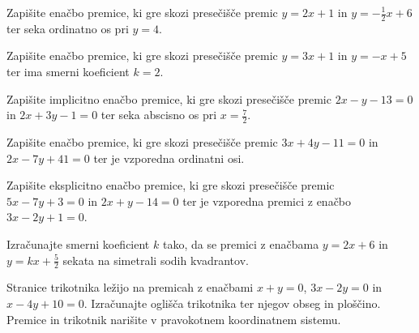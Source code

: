        
            
            \begin{naloga}
                Zapišite enačbo premice, ki gre skozi presečišče premic $y=2x+1$ in $y=-\frac{1}{2}x+6$ ter seka ordinatno os pri $y=4$.
            \end{naloga}

            \begin{naloga}
                Zapišite enačbo premice, ki gre skozi presečišče premic $y=3x+1$ in $y=-x+5$ ter ima smerni koeficient $k=2$.
            \end{naloga}

            \begin{naloga}
                Zapišite implicitno enačbo premice, ki gre skozi presečišče premic $2x-y-13=0$ in $2x+3y-1=0$ ter seka abscisno os pri $x=\frac{7}{2}$.
            \end{naloga}

        


        
            
            \begin{naloga}
                Zapišite enačbo premice, ki gre skozi presečišče premic $3x+4y-11=0$ in $2x-7y+41=0$ ter je vzporedna ordinatni osi.
            \end{naloga}

            \begin{naloga}
                Zapišite eksplicitno enačbo premice, ki gre skozi presečišče premic $5x-7y+3=0$ in $2x+y-14=0$ ter je vzporedna premici z enačbo $3x-2y+1=0$.
            \end{naloga}

            \begin{naloga}
                Izračunajte smerni koeficient $k$ tako, da se premici z enačbama $y=2x+6$ in $y=kx+\frac{5}{2}$ sekata na simetrali sodih kvadrantov.
            \end{naloga}

        


        
            
            \begin{naloga}
                Stranice trikotnika ležijo na premicah z enačbami $x+y=0$, $3x-2y=0$ in $x-4y+10=0$. 
                Izračunajte oglišča trikotnika ter njegov obseg in ploščino.
                Premice in trikotnik narišite v pravokotnem koordinatnem sistemu.
            \end{naloga}

